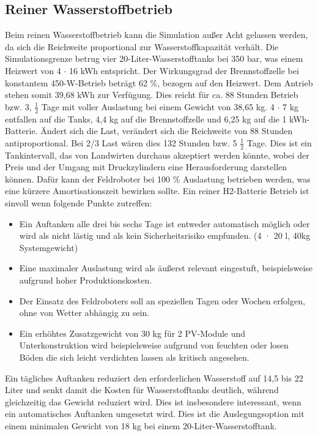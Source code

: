 \subsection{Reiner Wasserstoffbetrieb}
Beim reinen Wasserstoffbetrieb kann die Simulation außer Acht gelassen werden, da sich die Reichweite proportional zur Wasserstoffkapazität verhält. Die Simulationsgrenze betrug vier 20-Liter-Wasserstofftanks bei 350 bar, was einem Heizwert von 4 $\cdot$ 16 kWh entspricht. Der Wirkungsgrad der Brennstoffzelle bei konstantem 450-W-Betrieb beträgt 62 \%, bezogen auf den Heizwert. Dem Antrieb stehen somit 39,68 kWh zur Verfügung. Dies reicht für ca. 88 Stunden Betrieb bzw. 3, $\frac{1}{2}$ Tage mit voller Auslastung bei einem Gewicht von 38,65 kg.  4 $\cdot$ 7 kg entfallen auf die Tanks, 4,4 kg auf die Brennstoffzelle und 6,25 kg auf die 1 kWh-Batterie. Ändert sich die Last, verändert sich die Reichweite von 88 Stunden antiproportional. Bei 2/3 Last wären dies 132 Stunden bzw. 5 $\frac{1}{2}$ Tage. Dies ist ein Tankintervall, das von Landwirten durchaus akzeptiert werden könnte, wobei der Preis und der Umgang mit Druckzylindern eine Herausforderung darstellen können. 
Dafür kann der Feldroboter bei 100 \% Auslastung betrieben werden, was eine kürzere Amortisationszeit bewirken sollte.
Ein reiner H2-Batterie Betrieb ist sinvoll wenn folgende Punkte zutreffen: \\
\begin{itemize}
    \item Ein Auftanken alle drei bis sechs Tage ist entweder automatisch möglich oder wird als nicht lästig und als kein Sicherheitsrisiko empfunden. (4 · 20 l, 40kg Systemgewicht)
    \item Eine maximaler Auslastung wird als äußerst relevant eingestuft, beispielsweise aufgrund hoher Produktionskosten.
    \item Der Einsatz des Feldroboters soll an speziellen Tagen oder Wochen erfolgen, ohne von Wetter abhängig zu sein.
    \item Ein erhöhtes Zusatzgewicht von 30 kg für 2 PV-Module und Unterkonstruktion wird beispielsweise aufgrund von feuchten oder losen Böden die sich leicht verdichten lassen als kritisch angesehen.
\end{itemize}
Ein tägliches Auftanken reduziert den erforderlichen Wasserstoff auf 14,5 bis 22 Liter und senkt damit die Kosten für Wasserstofftanks deutlich, während gleichzeitig das Gewicht reduziert wird. Dies ist insbesondere interessant, wenn ein automatisches Auftanken umgesetzt wird. Dies ist die Auslegungsoption mit einem minimalen Gewicht von 18 kg bei einem 20-Liter-Wasserstofftank.




